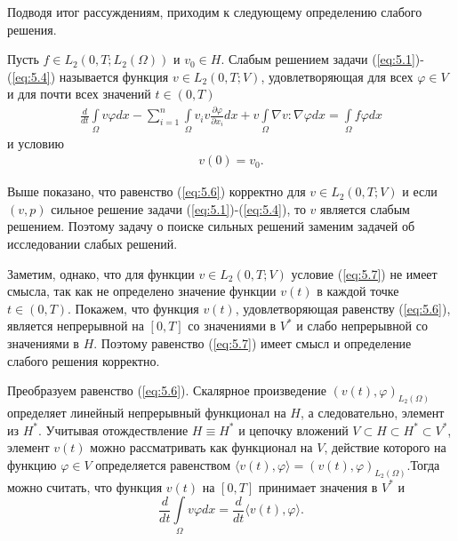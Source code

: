 Подводя итог рассуждениям, приходим к следующему определению слабого решения.
\begin{definition}
    Пусть $f\in L_2(0,T;L_2(\Omega))$ и $v_0\in H$. Слабым решением задачи (\ref{eq:5.1})-(\ref{eq:5.4}) называется функция $v\in L_2(0, T;V)$,
    удовлетворяющая для всех $\varphi \in V$ и для почти всех значений $t \in (0, T)$
    \begin{equation}\label{eq:5.6}
        \begin{gathered}
            \frac{d}{dt}\int\limits_\Omega v \varphi dx-\sum_{i=1}^{n}\int\limits_\Omega v_i v
            \frac{\partial \varphi }{\partial x_i}dx + v\int\limits_\Omega \nabla v :\nabla\varphi dx=
            \int\limits_\Omega f \varphi dx
        \end{gathered}
    \end{equation}
    и условию
    \begin{equation}\label{eq:5.7}
        \begin{gathered}
            v(0) = v_0.
        \end{gathered}
    \end{equation}
\end{definition}

Выше показано, что равенство (\ref{eq:5.6}) корректно для $v \in L_2(0, T; V)$ и если $(v, p)$ сильное решение задачи (\ref{eq:5.1})-(\ref{eq:5.4}),
то $v$ является слабым решением. Поэтому задачу о поиске сильных решений заменим задачей об исследовании слабых решений.

Заметим, однако, что для функции $v \in L_2(0, T; V)$ условие (\ref{eq:5.7}) не имеет смысла, так как не определено значение функции $v(t)$ в каждой точке
$t \in (0, T)$. Покажем, что функция $v(t)$, удовлетворяющая равенству (\ref{eq:5.6}), является непрерывной на $[0, T]$ со значениями в $V^\ast$ и слабо
непрерывной со значениями в $H$. Поэтому равенство (\ref{eq:5.7}) имеет смысл и определение слабого решения корректно.

Преобразуем равенство (\ref{eq:5.6}). Скалярное произведение $(v(t), \varphi)_{L_2(\Omega)}$ определяет линейный непрерывный функционал на $H$, а следовательно,
элемент из $H^\ast$. Учитывая отождествление $H \equiv H^\ast$ и цепочку вложений $V \subset H \subset H^\ast \subset V^\ast$,
элемент $v(t)$ можно рассматривать как функционал на $V$, действие которого на функцию $\varphi \in V$ определяется равенством 
$\langle v(t),\varphi \rangle = (v(t),\varphi)_{L_2(\Omega)}$.Тогда можно считать, что функция $v(t)$ на $[0, T]$ принимает значения в $V^\ast$ и
$$\frac{d}{dt}\int\limits_\Omega v \varphi dx=\frac{d}{dt}\langle v(t),\varphi \rangle.$$

